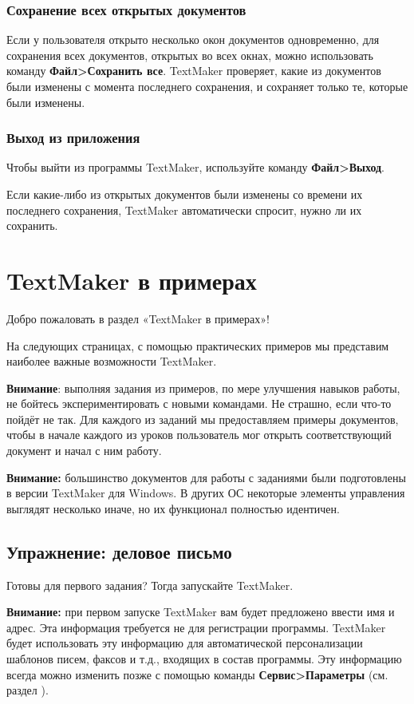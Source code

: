 ﻿\documentclass[a4paper,10pt]{article}
\begin{document}
\subsubsection{Сохранение всех открытых документов}
Если у пользователя открыто несколько окон документов одновременно, для сохранения всех документов, открытых во всех окнах, можно использовать команду \textbf{Файл>Сохранить все}. TextMaker проверяет, какие из документов были изменены с момента последнего сохранения, и сохраняет только те, которые были изменены.

\subsubsection{Выход из приложения}
Чтобы выйти из программы TextMaker, используйте команду \textbf{Файл>Выход}.

Если какие-либо из открытых документов были изменены со времени их последнего сохранения, TextMaker автоматически спросит, нужно ли их сохранить.

\section{TextMaker в примерах} \label{sec:tmвп}
Добро пожаловать в раздел «TextMaker в примерах»!

На следующих страницах, с помощью практических примеров мы представим наиболее важные возможности TextMaker.

\textbf{Внимание}: выполняя задания из примеров, по мере улучшения навыков работы, не бойтесь экспериментировать с новыми командами. Не страшно, если что-то пойдёт не так. Для каждого из заданий мы предоставляем примеры документов, чтобы в начале каждого из уроков пользователь мог открыть соответствующий документ и начал с ним работу.

\begin{mdframed}[backgroundcolor=blue!10]
\textbf{Внимание:} большинство документов для работы с заданиями были подготовлены в версии TextMaker для Windows. В других ОС некоторые элементы управления выглядят несколько иначе, но их функционал полностью идентичен. 
\end{mdframed}

\subsection{Упражнение: деловое письмо}
Готовы для первого задания? Тогда запускайте TextMaker.

\begin{mdframed}[backgroundcolor=blue!10]
\textbf{Внимание:} при первом запуске TextMaker вам будет предложено ввести имя и адрес. Эта информация требуется не для регистрации программы. TextMaker будет использовать эту информацию для автоматической персонализации шаблонов писем, факсов и т.д., входящих в состав программы. Эту информацию всегда можно изменить позже с помощью команды \textbf{Сервис>Параметры} (см. раздел ).
\end{mdframed}
\end{document}
